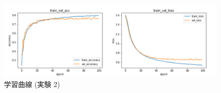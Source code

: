\documentclass[twocolumn]{jarticle}     %
\begin{document}
\begin{figure}[!thb]
  \centering
  \includegraphics[scale=0.45]{d2v_ex2.png}
  \caption{学習曲線 (実験 2)}
  \label{fig:d2v_ex2}
\end{figure}




\end{document}
